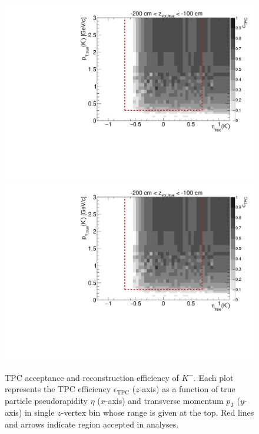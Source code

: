 \begin{figure}[hb]
\caption[TPC acceptance and reconstruction efficiency of $K^{-}$.]{TPC acceptance and reconstruction efficiency of $K^{-}$. Each plot represents the TPC efficiency $\epsilon_{\text{TPC}}$ ($z$-axis) as a function of true particle pseudorapidity $\eta$ ($x$-axis) and transverse momentum $p_{T}$ ($y$-axis) in single $z$-vertex bin whose range is given at the top. Red lines and arrows indicate region accepted in analyses.}\label{fig:eff_kaon_minus}
\centering
\parbox{0.495\textwidth}{
  \centering
  \includegraphics[width=\linewidth,page=3]{graphics/eff/Eff2D_TPC_kaon_Minus.pdf}\\
  \includegraphics[width=\linewidth,page=5]{graphics/eff/Eff2D_TPC_kaon_Minus.pdf}\\
}
\end{figure}
